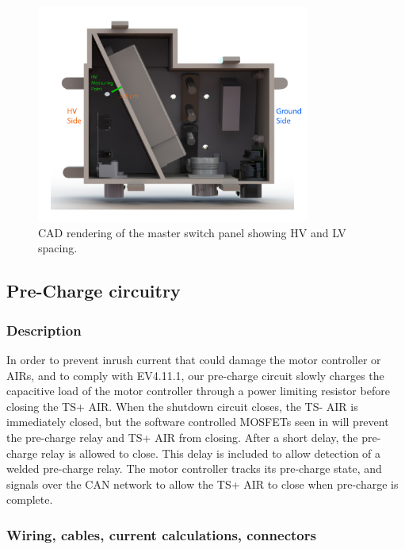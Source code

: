 \documentclass{article}
\begin{document}
\begin{figure}[H]
\centering
\includegraphics[width=0.8\textwidth]{MSP_HV_LV_spacing.jpg}
\caption{CAD rendering of the master switch panel showing HV and LV spacing.}
\label{fig:msp_spacing}
\end{figure} 

\subsection{Pre-Charge circuitry}\label{pre_charge_circuitry}
\subsubsection{Description}

In order to prevent inrush current that could damage the motor controller or AIRs, and to comply with EV4.11.1, our pre-charge circuit slowly charges the capacitive load of the motor controller through a power limiting resistor before closing the TS+ AIR. When the shutdown circuit closes, the TS- AIR is immediately closed, but the software controlled MOSFETs seen in  will prevent the pre-charge relay and TS+ AIR from closing. After a short delay, the pre-charge relay is allowed to close. This delay is included to allow detection of a welded pre-charge relay. The motor controller tracks its pre-charge state, and signals over the CAN network to allow the TS+ AIR to close when pre-charge is complete. 

\subsubsection{Wiring, cables, current calculations, connectors}
\end{document}
